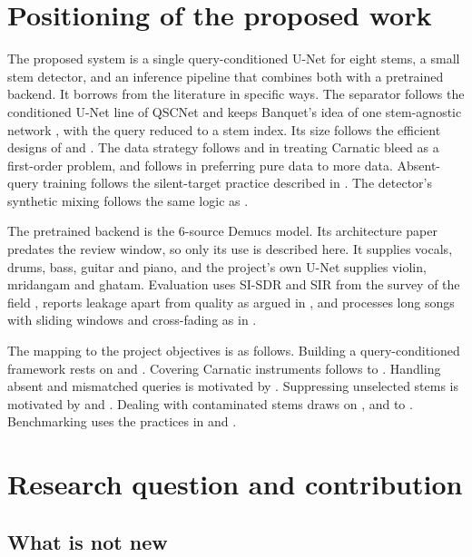 \documentclass[12pt,a4paper]{article}
\begin{document}
\section{Positioning of the proposed work}

The proposed system is a single query-conditioned U-Net for eight stems, a small stem detector, and an inference pipeline that combines both with a pretrained backend. It borrows from the literature in specific ways. The separator follows the conditioned U-Net line of QSCNet \cite{qscnet} and keeps Banquet's idea of one stem-agnostic network \cite{banquet}, with the query reduced to a stem index. Its size follows the efficient designs of \cite{scnet} and \cite{moiseslight}. The data strategy follows \cite{carnaticft} and \cite{sanidha} in treating Carnatic bleed as a first-order problem, and follows \cite{hive} in preferring pure data to more data. Absent-query training follows the silent-target practice described in \cite{pmq}. The detector's synthetic mixing follows the same logic as \cite{persian}.

The pretrained backend is the 6-source Demucs model. Its architecture paper predates the review window, so only its use is described here. It supplies vocals, drums, bass, guitar and piano, and the project's own U-Net supplies violin, mridangam and ghatam. Evaluation uses SI-SDR and SIR from the survey of the field \cite{survey30}, reports leakage apart from quality as argued in \cite{mapss}, and processes long songs with sliding windows and cross-fading as in \cite{msst}.

The mapping to the project objectives is as follows. Building a query-conditioned framework rests on \cite{banquet} and \cite{qscnet}. Covering Carnatic instruments follows \cite{carnaticft} to \cite{ssn}. Handling absent and mismatched queries is motivated by \cite{pmq}. Suppressing unselected stems is motivated by \cite{mapss} and \cite{perceptual}. Dealing with contaminated stems draws on \cite{sdx23}, \cite{sanidha} and \cite{spheres} to \cite{ensembles}. Benchmarking uses the practices in \cite{survey30} and \cite{msst}.

\section{Research question and contribution}

\subsection{What is not new}
\end{document}
